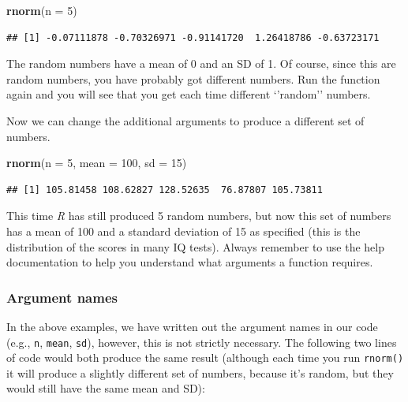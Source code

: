 \documentclass[
]{scrartcl}
\newenvironment{Shaded}{\begin{snugshade}}{\end{snugshade}}
\newcommand{\AttributeTok}[1]{\textcolor[rgb]{0.13,0.29,0.53}{#1}}
\newcommand{\DecValTok}[1]{\textcolor[rgb]{0.00,0.00,0.81}{#1}}
\newcommand{\FunctionTok}[1]{\textcolor[rgb]{0.13,0.29,0.53}{\textbf{#1}}}
\newcommand{\NormalTok}[1]{#1}
\begin{document}
\begin{Shaded}
\begin{Highlighting}[]
\FunctionTok{rnorm}\NormalTok{(}\AttributeTok{n =} \DecValTok{5}\NormalTok{)}
\end{Highlighting}
\end{Shaded}

\begin{verbatim}
## [1] -0.07111878 -0.70326971 -0.91141720  1.26418786 -0.63723171
\end{verbatim}

The random numbers have a mean of 0 and an SD of 1. Of course, since this are random numbers, you have probably got different numbers. Run the function again and you will see that you get each time different `'random'' numbers.

Now we can change the additional arguments to produce a different set of numbers.

\begin{Shaded}
\begin{Highlighting}[]
\FunctionTok{rnorm}\NormalTok{(}\AttributeTok{n =} \DecValTok{5}\NormalTok{, }\AttributeTok{mean =} \DecValTok{100}\NormalTok{, }\AttributeTok{sd =} \DecValTok{15}\NormalTok{)}
\end{Highlighting}
\end{Shaded}

\begin{verbatim}
## [1] 105.81458 108.62827 128.52635  76.87807 105.73811
\end{verbatim}

This time \emph{R} has still produced 5 random numbers, but now this set of numbers has a mean of 100 and a standard deviation of 15 as specified (this is the distribution of the scores in many IQ tests). Always remember to use the help documentation to help you understand what arguments a function requires.

\subsubsection{Argument names}\label{argument-names}

In the above examples, we have written out the argument names in our code (e.g., \texttt{n}, \texttt{mean}, \texttt{sd}), however, this is not strictly necessary. The following two lines of code would both produce the same result (although each time you run \texttt{rnorm()} it will produce a slightly different set of numbers, because it's random, but they would still have the same mean and SD):
\end{document}
